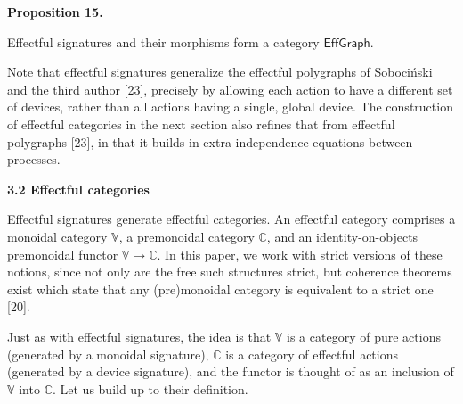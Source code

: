 \documentclass[10pt,a4paper]{article}
\begin{document}
 
 
\par\medskip\noindent\textbf{Proposition 15.}\par
 
 
Effectful signatures and their morphisms form a category $\mathsf{EffGraph}$.\par
 
 
 
 
Note that effectful signatures generalize the effectful polygraphs of Sobociński and the third author [23], precisely by allowing each action to have a different set of devices, rather than all actions having a single, global device. The construction of effectful categories in the next section also refines that from effectful polygraphs [23], in that it builds in extra independence equations between processes.\par
 
 
 
 
\par\medskip\noindent\textbf{3.2 Effectful categories}\par
 
 
Effectful signatures generate effectful categories. An effectful category comprises a monoidal category $\mathbb{V}$, a premonoidal category $\mathbb{C}$, and an identity-on-objects premonoidal functor $\mathbb{V}\to\mathbb{C}$. In this paper, we work with strict versions of these notions, since not only are the free such structures strict, but coherence theorems exist which state that any (pre)monoidal category is equivalent to a strict one [20].\par
 
 
 
Just as with effectful signatures, the idea is that $\mathbb{V}$ is a category of pure actions (generated by a monoidal signature), $\mathbb{C}$ is a category of effectful actions (generated by a device signature), and the functor is thought of as an inclusion of $\mathbb{V}$ into $\mathbb{C}$. Let us build up to their definition.\par
 
\end{document}
